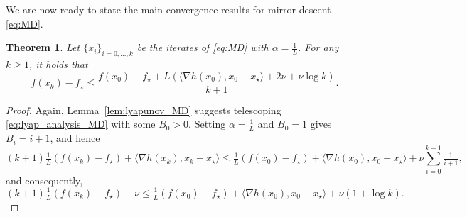 \documentclass[a4paper]{article}
\renewcommand{\leq}{\leqslant}
\renewcommand{\geq}{\geqslant}
\newcommand{\ip}[2]{\langle #1, #2\rangle}
\newtheorem{theorem}{Theorem}
\begin{document}
We are now ready to state the main convergence results for mirror descent \eqref{eq:MD}.
\begin{theorem}\label{thm:MD}
        Let $\{x_i\}_{i=0,\ldots,k}$ be the iterates of \eqref{eq:MD} with $\alpha = \frac 1 L$.
        For any $k\geq 1$, it holds that
        \begin{equation}\label{eq:MD_guarantee}
                f(x_k)-f_\star
                \leq
                \frac{f(x_0) - f_\star + L\left( \ip{\nabla h(x_{0})}{ x_{0}-x_\star} + 2\nu +  \nu \log k\right)}{k+1}.
        \end{equation}
\end{theorem}
\begin{proof}
        Again, Lemma~\ref{lem:lyapunov_MD} suggests telescoping \eqref{eq:lyap_analysis_MD} with some $B_0>0$.
        Setting $\alpha=\tfrac1L$ and $B_0=1$ gives $B_i=i+1$, and hence
        \begin{equation*}
                (k+1)\tfrac1L\left(f(x_{k})-f_\star\right) + \ip{\nabla h(x_{k})}{ x_{k}-x_\star}
                \leq
                \tfrac1L( f(x_0)-f_\star) +  \ip{\nabla h(x_{0})}{ x_{0}-x_\star} + \nu \sum_{i=0}^{k-1}\tfrac{1}{i+1},
        \end{equation*}
        and consequently,
        \[ 
                (k+1)\tfrac1L\left(f(x_{k})-f_\star\right) -\nu
                \leq
                \tfrac1L( f(x_0)-f_\star) +  \ip{\nabla h(x_{0})}{ x_{0}-x_\star} + \nu \left(1+\log k\right).
        \]
\end{proof}
\end{document}
